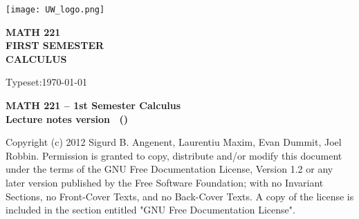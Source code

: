 \texttt{[image: UW\_logo.png]}
\vfill

\begin{flushright}
  \Huge\sffamily\bfseries
  MATH 221 \\
  FIRST SEMESTER \\
  CALCULUS\\[1in]
  \large \semester
\end{flushright}

\vfill
\begin{flushright}
\textsf{Typeset:\today}
\end{flushright}

\newpage
\begin{center}
  \bfseries\sffamily MATH 221 -- 1st Semester Calculus \\
  Lecture notes version \version\ (\semester)
\end{center}

\begin{center}
  Copyright (c) 2012 Sigurd B. Angenent, Laurentiu Maxim, Evan Dummit, Joel Robbin.
  Permission is granted to copy, distribute and/or modify this document under
  the terms of the GNU Free Documentation License, Version 1.2 or any later
  version published by the Free Software Foundation; with no Invariant Sections,
  no Front-Cover Texts, and no Back-Cover Texts.  A copy of the license is
  included in the section entitled "GNU Free Documentation License".
\end{center}
\newpage
\sffamily\footnotesize
\begin{multicols}{2}
    \tableofcontents
\end{multicols}

\rmfamily\normalsize


